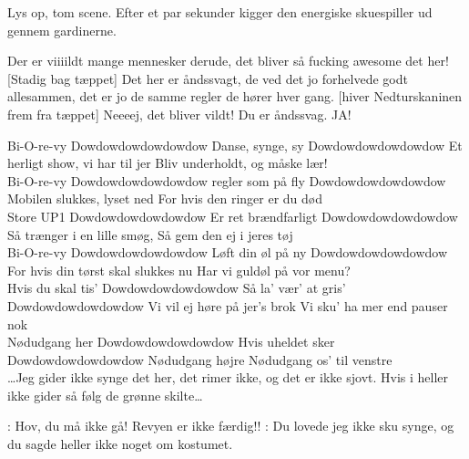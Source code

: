 \documentclass[a4paper,12pt]{article}
\begin{document}
\begin{sketch}


\scene Lys op, tom scene. Efter et par sekunder kigger den energiske skuespiller ud gennem gardinerne.

 Der er viiiildt mange mennesker derude, det bliver så fucking awesome det her! 
[Stadig bag tæppet] Det her er åndssvagt, de ved det jo forhelvede godt allesammen, det er jo de samme regler de hører hver gang.
[hiver Nedturskaninen frem fra tæppet] Neeeej, det bliver vildt!
 Du er åndssvag.
 JA!


Bi-O-re-vy
Dowdowdowdowdowdow
Danse, synge, sy
Dowdowdowdowdowdow
Et herligt show, vi har til jer
Bliv underholdt, og måske lær!\\

Bi-O-re-vy
Dowdowdowdowdowdow
regler som på fly
Dowdowdowdowdowdow
Mobilen slukkes, lyset ned
For hvis den ringer er du død\\

Store UP1
Dowdowdowdowdowdow
Er ret brændfarligt
Dowdowdowdowdowdow
Så trænger i en lille smøg,
Så gem den ej i jeres tøj\\

Bi-O-re-vy
Dowdowdowdowdowdow
Løft din øl på ny
Dowdowdowdowdowdow
For hvis din tørst skal slukkes nu
Har vi guldøl på vor menu?\\

Hvis du skal tis'
Dowdowdowdowdowdow
Så la' vær' at gris'
Dowdowdowdowdowdow
Vi vil ej høre på jer's brok
Vi sku' ha mer end pauser nok\\

Nødudgang her
Dowdowdowdowdowdow
Hvis uheldet sker
Dowdowdowdowdowdow
Nødudgang højre
Nødudgang os' til venstre\\

\ldots Jeg gider ikke synge det her, det rimer ikke, og det er ikke sjovt. Hvis i heller ikke gider så følg de grønne skilte\ldots

: Hov, du må ikke gå! Revyen er ikke færdig!!
: Du lovede jeg ikke sku synge, og du sagde heller ikke noget om kostumet.



\end{sketch}
\end{document}
